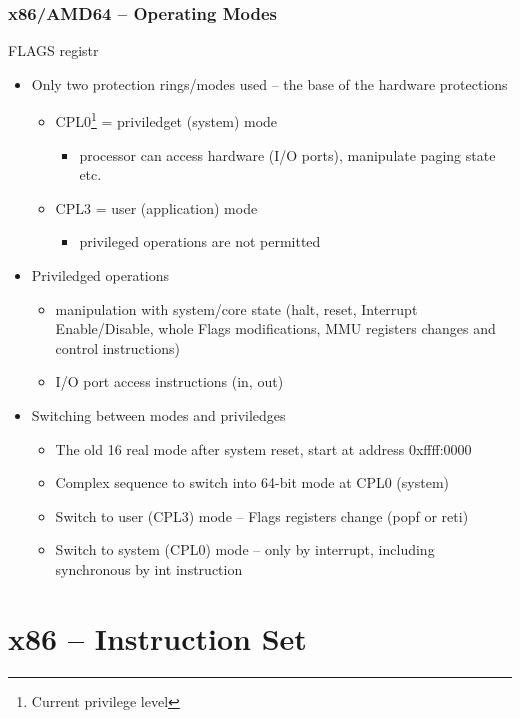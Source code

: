 \documentclass{beamer}
\begin{document}
\begin{frame}
\frametitle{x86/AMD64 -- Operating Modes}
FLAGS registr 
\begin{itemize}
  \item Only two protection rings/modes used -- the base of the hardware protections
  \begin{itemize}
    \item CPL0\footnote{Current privilege level} = priviledget (system) mode
    \begin{itemize}
      \item processor can access hardware (I/O ports), manipulate paging state etc. 
    \end{itemize}
    \item CPL3 = user (application) mode
    \begin{itemize}
      \item privileged operations are not permitted
    \end{itemize}
  \end{itemize}
  \item Priviledged operations
  \begin{itemize}
    \item manipulation with system/core state (halt, reset, Interrupt Enable/Disable, whole Flags modifications, MMU registers changes and control instructions) 
    \item I/O port access instructions (in, out)
  \end{itemize}

  \item Switching between modes and priviledges
  \begin{itemize}
    \item The old 16 real mode after system reset, start at address 0xffff:0000
    \item Complex sequence to switch into 64-bit mode at CPL0 (system)
    \item Switch to user (CPL3) mode -- Flags registers change (popf or reti)
    \item Switch to system (CPL0) mode -- only by interrupt, including synchronous by int instruction
  \end{itemize}
\end{itemize}
\end{frame}


\section{x86 -- Instruction Set}
\end{document}
